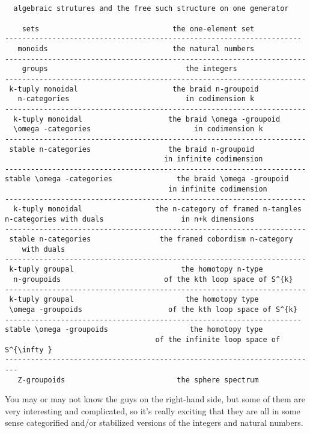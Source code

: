 \begin{verbatim}


  algebraic strutures and the free such structure on one generator

    sets                               the one-element set
---------------------------------------------------------------------
   monoids                             the natural numbers
----------------------------------------------------------------------
    groups                                the integers
----------------------------------------------------------------------
 k-tuply monoidal                      the braid n-groupoid 
   n-categories                           in codimension k
----------------------------------------------------------------------
  k-tuply monoidal                    the braid \omega -groupoid 
  \omega -categories                        in codimension k
----------------------------------------------------------------------
 stable n-categories                  the braid n-groupoid 
                                     in infinite codimension
----------------------------------------------------------------------
stable \omega -categories               the braid \omega -groupoid 
                                      in infinite codimension
----------------------------------------------------------------------
  k-tuply monoidal                 the n-category of framed n-tangles
n-categories with duals                  in n+k dimensions
----------------------------------------------------------------------
 stable n-categories                the framed cobordism n-category
    with duals
----------------------------------------------------------------------
 k-tuply groupal                         the homotopy n-type 
  n-groupoids                        of the kth loop space of S^{k}
----------------------------------------------------------------------
 k-tuply groupal                          the homotopy type  
 \omega -groupoids                    of the kth loop space of S^{k}
---------------------------------------------------------------------
stable \omega -groupoids                   the homotopy type 
                                   of the infinite loop space of S^{\infty }
-------------------------------------------------------------------------
   Z-groupoids                          the sphere spectrum       

\end{verbatim}
    
You may or may not know the guys on the right-hand side, but some of
them are very interesting and complicated, so it's really exciting that
they are all in some sense categorified and/or stabilized versions of 
the integers and natural numbers.  

